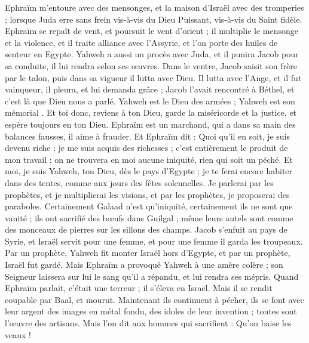 \begin{multicols}{2}
\VerseOne{}Ephraïm m'entoure avec des mensonges, et la maison d'Israël avec des tromperies ; lorsque Juda erre sans frein vis-à-vis du Dieu Puissant, vis-à-vis du Saint fidèle.
Ephraïm se repaît de vent, et poursuit le vent d'orient ; il multiplie le mensonge et la violence, et il traite alliance avec l'Assyrie, et l'on porte des huiles de senteur en Egypte.
Yahweh a aussi un procès avec Juda, et il punira Jacob pour sa conduite, il lui rendra selon ses œuvres.
Dans le ventre, Jacob saisit son frère par le talon, puis dans sa vigueur il lutta avec Dieu.
Il lutta avec l’Ange, et il fut vainqueur, il pleura, et lui demanda grâce ; Jacob l’avait rencontré à Béthel, et c’est là que Dieu nous a parlé.
Yahweh est le Dieu des armées ; Yahweh est son mémorial .
Et toi donc, reviens à ton Dieu, garde la miséricorde et la justice, et espère toujours en ton Dieu.
Ephraïm est un marchand, qui a dans sa main des balances fausses, il aime à frauder.
Et Ephraïm dit : Quoi qu'il en soit, je suis devenu riche ; je me suis acquis des richesses ; c’est entièrement le produit de mon travail ; on ne trouvera en moi aucune iniquité, rien qui soit un péché.
Et moi, je suis Yahweh, ton Dieu, dès le pays d'Egypte ; je te ferai encore habiter dans des tentes, comme aux jours des fêtes solennelles.
Je parlerai par les prophètes, et je multiplierai les visions, et par les prophètes, je proposerai des paraboles.
Certainement Galaad n'est qu'iniquité, certainement ils ne sont que vanité ; ils ont sacrifié des bœufs dans Guilgal ; même leurs autels sont comme des monceaux de pierres sur les sillons des champs.
Jacob s'enfuit au pays de Syrie, et Israël servit pour une femme, et pour une femme il garda les troupeaux.
Par un prophète, Yahweh fit monter Israël hors d'Egypte, et par un prophète, Israël fut gardé.
Mais Ephraïm a provoqué Yahweh à une amère colère ; son Seigneur laissera sur lui le sang qu’il a répandu, et lui rendra ses mépris.
\VerseOne{}Quand Ephraïm parlait, c’était une terreur ; il s'éleva en Israël. Mais il se rendit coupable par Baal, et mourut.
Maintenant ils continuent à pécher, ils se font avec leur argent des images en métal fondu, des idoles de leur invention ; toutes sont l’œuvre des artisans. Mais l’on dit aux hommes qui sacrifient : Qu’on baise les veaux !

\end{multicols}
